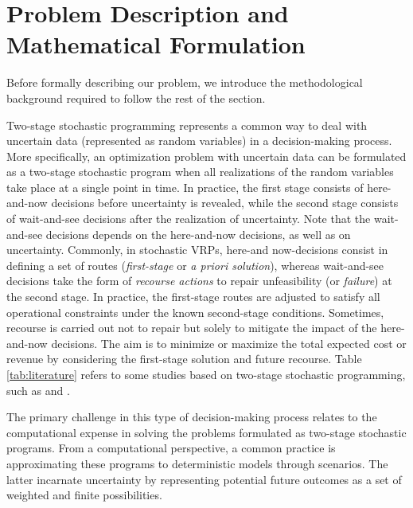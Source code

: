 \documentclass[preprint,11pt,authoryear]{elsarticle}
\begin{document}
\section{Problem Description and Mathematical Formulation} \label{problem}

Before formally describing our problem, we introduce the methodological background required to follow the rest of the section. 

Two-stage stochastic programming represents a common way to deal with uncertain data (represented as random variables) in a
decision-making process. More specifically, an optimization problem with uncertain data can be formulated as a two-stage stochastic program when all realizations of the random variables take place at a single
point in time. In practice, the first stage consists of here-and-now decisions before uncertainty is revealed, while the second stage consists of wait-and-see decisions after the realization of uncertainty. Note that the wait-and-see decisions depends on the here-and-now decisions, as well as on uncertainty. Commonly, in stochastic VRPs, here-and now-decisions consist in defining a set of routes (\textit{first-stage} or \textit{a priori solution}), whereas wait-and-see decisions take the form of \textit{recourse actions} to repair unfeasibility (or \textit{failure}) at the second stage. In practice, the first-stage routes are adjusted to satisfy all operational constraints under the known second-stage conditions. Sometimes, recourse is carried out not to repair but solely to mitigate the impact of the here-and-now decisions. The aim is to minimize or maximize the total expected cost or revenue by considering
the first-stage solution and future recourse. Table \ref{tab:literature} refers to some studies based on two-stage stochastic programming, such as \cite{Laporte2010} and \cite{Nolz2014}. 

The
primary challenge in this type of decision-making process relates to the computational expense in solving the problems formulated as two-stage stochastic programs.
From a computational perspective, a common practice  is approximating these programs to deterministic models through scenarios. The latter incarnate uncertainty by representing potential future outcomes as a set of weighted and finite possibilities.  
\end{document}
